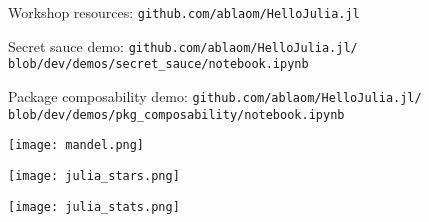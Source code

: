 \documentclass[t]{beamer}
\begin{document}
\begin{frame}
  \begin{block}{Workshop resources:}
    {\large\texttt{github.com/ablaom/HelloJulia.jl}}
    \end{block}
\end{frame}

\begin{frame}
  \begin{block}{Secret sauce demo:}
    {\large\texttt{github.com/ablaom/HelloJulia.jl/}}\newline
    {\large\texttt{blob/dev/demos/secret\_sauce/notebook.ipynb}}
    \end{block}
\end{frame}
%
\begin{frame}
  \begin{block}{Package composability demo:}
    {\large\texttt{github.com/ablaom/HelloJulia.jl/}}\newline
    {\large\texttt{blob/dev/demos/pkg\_composability/notebook.ipynb}}
    \end{block}
\end{frame}

\begin{frame}[plain]
     \texttt{[image: mandel.png]}
\end{frame}
\begin{frame}[plain]
     \texttt{[image: julia\_stars.png]}
\end{frame}



\begin{frame}[plain]
     \texttt{[image: julia\_stats.png]}
\end{frame}




\end{document}
